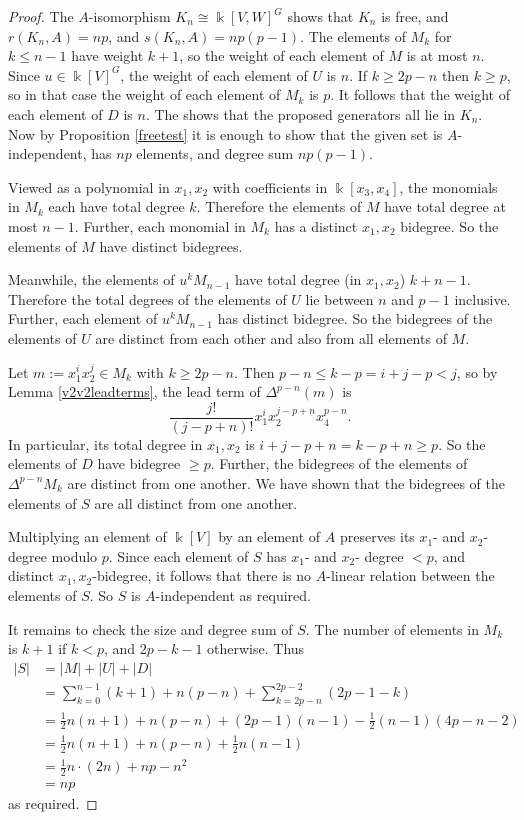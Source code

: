 \documentclass[10pt,a4paper]{amsart}
\newcommand{\kk}{\Bbbk}
\begin{document}
\begin{proof}
The $A$-isomorphism $K_n \cong \kk[V,W]^G$ shows that $K_n$ is free, and $r(K_n,A) = np$, and $s(K_n,A) = np(p-1)$. 
The elements of $M_k$ for $k \leq n-1$ have weight $k+1$, so the weight of each element of $M$ is at most $n$. Since $u \in \kk[V]^G$, the weight of each element of $U$ is $n$. If $k \geq 2p-n$ then $k \geq p$, so in that case the weight of each element of $M_k$ is $p$. It follows that the weight of each element of $D$ is $n$. The shows that the proposed generators all lie in $K_n$. Now by Proposition \ref{freetest} it is enough to show that the given set is $A$-independent, has $np$ elements, and degree sum $np(p-1)$.

Viewed as a polynomial in $x_1,x_2$ with coefficients in $\kk[x_3,x_4]$, the monomials in $M_k$ each have total degree $k$. Therefore the elements of $M$ have total degree at most $n-1$. Further, each monomial in $M_k$ has a distinct $x_1,x_2$ bidegree. So the elements of $M$ have distinct bidegrees.

Meanwhile, the elements of $u^kM_{n-1}$ have total degree (in $x_1,x_2$) $k+n-1$. Therefore the total degrees of the elements of $U$ lie between $n$ and $p-1$ inclusive. Further, each element of $u^kM_{n-1}$ has distinct bidegree. So the bidegrees of the elements of $U$ are distinct from each other and also from all elements of $M$.

Let $m:= x_1^ix_2^j \in M_k$ with $k \geq 2p-n$. Then $p-n \leq k-p = i+j-p < j$, so by Lemma \ref{v2v2leadterms}, the lead term of $\Delta^{p-n}(m)$ is $$\frac{j!}{(j-p+n)!}x_1^ix_2^{j-p+n}x_4^{p-n}.$$
In particular, its total degree in $x_1,x_2$ is $i+j-p+n = k-p+n \geq p$. So the elements of $D$ have bidegree $\geq p$. Further, the bidegrees of the elements of $\Delta^{p-n}M_k$ are distinct from one another. We have shown that the bidegrees of the elements of $S$ are all distinct from one another.  

Multiplying an element of $\kk[V]$ by an element of $A$ preserves its $x_1$- and $x_2$- degree modulo $p$. Since each element of $S$ has $x_1$- and $x_2$- degree $<p$, and distinct $x_1,x_2$-bidegree, it follows that there is no $A$-linear relation between the elements of $S$. So $S$ is $A$-independent as required.

It remains to check the size and degree sum of $S$. The number of elements in $M_k$ is $k+1$ if $k < p$, and $2p-k-1$ otherwise. Thus
\begin{align*}
|S| &= |M|+|U|+|D|\\
&= \sum_{k=0}^{n-1} (k+1) + n(p-n) + \sum_{k=2p-n}^{2p-2} (2p-1-k)\\
&= \frac12 n(n+1) + n(p-n) + (2p-1)(n-1) - \frac12(n-1)(4p-n-2)\\
&= \frac12 n(n+1) + n(p-n) + \frac12 n(n-1)\\
&= \frac12 n \cdot (2n) + np-n^2\\
&=np
\end{align*}
as required. 


\end{proof}
\end{document}
